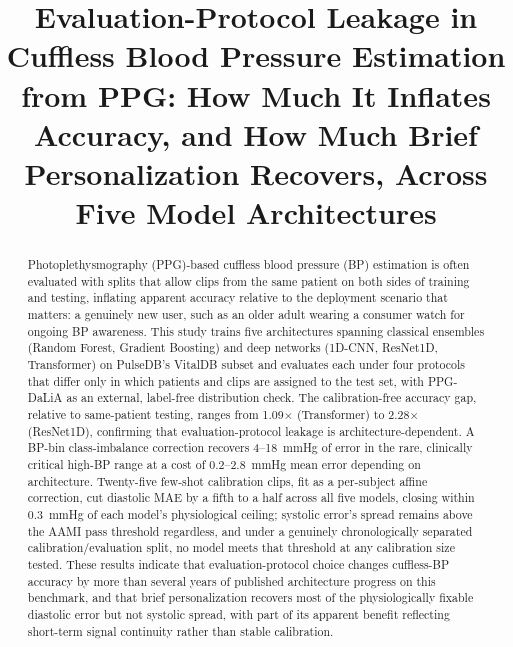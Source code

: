 \documentclass[journal]{IEEEtran}
\begin{document}
\title{Evaluation-Protocol Leakage in Cuffless Blood Pressure Estimation from PPG: How Much It Inflates Accuracy, and How Much Brief Personalization Recovers, Across Five Model Architectures}

\author{
}

\maketitle

\begin{abstract}
Photoplethysmography (PPG)-based cuffless blood pressure (BP) estimation is often evaluated with splits that allow clips from the same patient on both sides of training and testing, inflating apparent accuracy relative to the deployment scenario that matters: a genuinely new user, such as an older adult wearing a consumer watch for ongoing BP awareness. This study trains five architectures spanning classical ensembles (Random Forest, Gradient Boosting) and deep networks (1D-CNN, ResNet1D, Transformer) on PulseDB's VitalDB subset and evaluates each under four protocols that differ only in which patients and clips are assigned to the test set, with PPG-DaLiA as an external, label-free distribution check. The calibration-free accuracy gap, relative to same-patient testing, ranges from 1.09$\times$ (Transformer) to 2.28$\times$ (ResNet1D), confirming that evaluation-protocol leakage is architecture-dependent. A BP-bin class-imbalance correction recovers 4--18~mmHg of error in the rare, clinically critical high-BP range at a cost of 0.2--2.8~mmHg mean error depending on architecture. Twenty-five few-shot calibration clips, fit as a per-subject affine correction, cut diastolic MAE by a fifth to a half across all five models, closing within 0.3~mmHg of each model's physiological ceiling; systolic error's spread remains above the AAMI pass threshold regardless, and under a genuinely chronologically separated calibration/evaluation split, no model meets that threshold at any calibration size tested. These results indicate that evaluation-protocol choice changes cuffless-BP accuracy by more than several years of published architecture progress on this benchmark, and that brief personalization recovers most of the physiologically fixable diastolic error but not systolic spread, with part of its apparent benefit reflecting short-term signal continuity rather than stable calibration.
\end{abstract}
\end{document}
